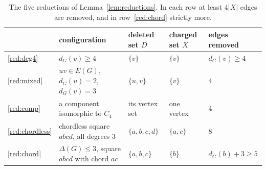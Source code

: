 \documentclass[11pt,letterpaper]{article}
\numberwithin{equation}{section}
\theoremstyle{plain}
\theoremstyle{definition}
\theoremstyle{remark}
\begin{document}
\begin{table}[b]
\centering
\begin{tabular}{@{}lllll@{}}
\toprule
& configuration & deleted set $D$ & charged set $X$ & edges removed \\
\midrule
\ref{red:deg4} & $d_G(v)\ge4$ & $\{v\}$ & $\{v\}$ & $d_G(v)\ge4$ \\
\ref{red:mixed} & $uv\in E(G)$, $d_G(u)=2$, $d_G(v)=3$ & $\{u,v\}$ & $\{v\}$ & $4$ \\
\ref{red:comp} & a component isomorphic to $C_4$ & its vertex set & one vertex & $4$ \\
\ref{red:chordless} & chordless square $abcd$, all degrees $3$ & $\{a,b,c,d\}$ & $\{a,c\}$ & $8$ \\
\ref{red:chord} & $\Delta(G)\le3$, square $abcd$ with chord $ac$ & $\{a,b,c\}$ & $\{b\}$ & $d_G(b)+3\ge5$ \\
\bottomrule
\end{tabular}
\caption{The five reductions of Lemma~\ref{lem:reductions}. In each row at least $4|X|$ edges are removed, and in row~\ref{red:chord} strictly more.}
\label{tab:reductions}
\end{table}
\end{document}
